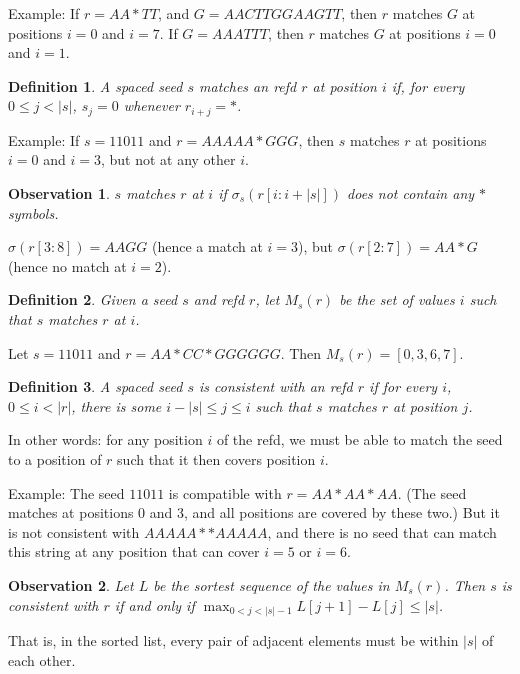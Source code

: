 \documentclass{article}
\newtheorem{definition}{Definition}
\newtheorem{observation}{Observation}
\begin{document}
Example: If $r = AA*TT$, and $G = AACTTGGAAGTT$, then $r$ matches $G$
at positions $i=0$ and $i=7$.  If $G=AAATTT$, then $r$ matches $G$ at
positions $i=0$ and $i=1$.


\begin{definition}
  A spaced seed $s$ {\it matches} an refd $r$ at position $i$
  if, for every $0 \leq j < |s|$, $s_j = 0$
  whenever $r_{i+j}=*$.
\end{definition}

Example: If $s=11011$ and $r = AAAAA*GGG$, then $s$ matches $r$
at positions $i=0$ and $i=3$, but not at any other $i$.


\begin{observation}
$s$ matches $r$ at $i$ if $\sigma_s(r[i:i+|s|])$ does not contain any
  $*$ symbols.
\end{observation}


$\sigma(r[3:8]) = AAGG$ (hence a match at $i=3$), but $\sigma(r[2:7])
= AA*G$ (hence no match at $i=2$).

\begin{definition}
  Given a seed $s$ and refd $r$, let $M_s(r)$ be the set of values $i$
  such that $s$ matches $r$ at $i$.
\end{definition}

Let $s=11011$ and $r = AA*CC*GGGGGG$.  Then $M_s(r) = [0, 3, 6, 7]$.


\begin{definition}
  A spaced seed $s$ is consistent with an refd $r$ if
  for every $i$, $0 \leq i < |r|$, there is some
  $i - |s| \leq j \leq i$ such that $s$ matches $r$ at position $j$.
\end{definition}

In other words: for any position $i$ of the refd, we must be able to
match the seed to a position of $r$ such that it then covers position
$i$.

Example: The seed $11011$ is compatible with $r=AA*AA*AA$.  (The seed
matches at positions 0 and 3, and all positions are covered by these
two.)  But it is not consistent with $AAAAA**AAAAA$, and there is no
seed that can match this string at any position that can cover $i=5$
or $i=6$.

\begin{observation}
  Let $L$ be the sortest sequence of the values in $M_s(r)$.  Then $s$
  is consistent with $r$ if and only if $\max_{0 < j < |s|-1} L[j+1]-L[j] \leq |s|$.
\end{observation}
That is, in the sorted list, every pair of adjacent elements must be
within $|s|$ of each other.
\end{document}
